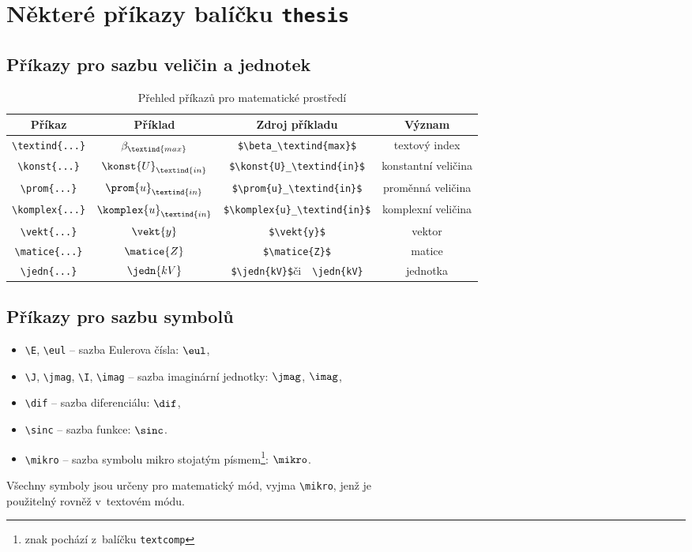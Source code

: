\chapter{Některé příkazy balíčku \texttt{thesis}}

\section{Příkazy pro sazbu veličin a jednotek}

\begin{table}[!h]
  \caption{Přehled příkazů pro matematické prostředí }
  \begin{center}
  	\small
	  \begin{tabular}{|c|c|c|c|}
	    \hline
	    Příkaz    						& Příklad 					& Zdroj příkladu  							& Význam  \\
	    \hline\hline
	    \verb|\textind{...}|	& $\beta_\textind{max}$ 	& \verb|$\beta_\textind{max}$|	& textový index \\
	    \hline
	    \verb|\konst{...}| 		& $\konst{U}_\textind{in}$ 				& \verb|$\konst{U}_\textind{in}$|		& konstantní veličina \\
	    \hline
	    \verb|\prom{...}| 		& $\prom{u}_\textind{in}$ & \verb|$\prom{u}_\textind{in}$| & proměnná veličina \\
	    \hline
	    \verb|\komplex{...}| 	& $\komplex{u}_\textind{in}$ & \verb|$\komplex{u}_\textind{in}$| & komplexní veličina \\
	    \hline
	    \verb|\vekt{...}| 		& $\vekt{y}$ 						& \verb|$\vekt{y}$| & vektor \\
	    \hline
	    \verb|\matice{...}| 	& $\matice{Z}$ 						& \verb|$\matice{Z}$| & matice \\
	    \hline
	    \verb|\jedn{...}| 		& $\jedn{kV}$ 						& \verb|$\jedn{kV}$|\quad či\ \, \verb|\jedn{kV}| & jednotka \\
	    \hline
	  \end{tabular}
  \end{center}
\end{table}

\section{Příkazy pro sazbu symbolů}

\begin{itemize}
  \item
    \verb|\E|, \verb|\eul| -- sazba Eulerova čísla: $\eul$,
  \item
    \verb|\J|, \verb|\jmag|, \verb|\I|, \verb|\imag| -- sazba imaginární jednotky: $\jmag$, $\imag$,
  \item
    \verb|\dif| -- sazba diferenciálu: $\dif$,
  \item
    \verb|\sinc| -- sazba funkce: $\sinc$.
  \item
    \verb|\mikro| -- sazba symbolu mikro stojatým písmem\footnote{znak pochází z~balíčku \texttt{textcomp}}: $\mikro$.

\end{itemize}
%
Všechny symboly jsou určeny pro matematický mód, vyjma \verb|\mikro|, jenž je\\ použitelný rovněž v~textovém módu.
